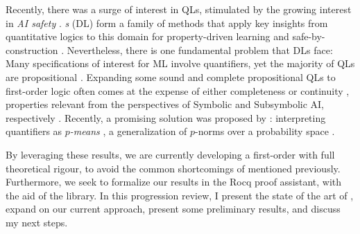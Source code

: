 Recently, there was a surge of interest in QLs, stimulated by the growing interest in \emph{AI safety} \mcita{}. \emph{\DL{}s} (DL) form a family of methods that apply key insights from quantitative logics to this domain for property-driven learning and safe-by-construction \InAI{} \mcita{}. Nevertheless, there is one fundamental problem that DLs face: Many specifications of interest for ML involve quantifiers, yet the majority of QLs are propositional \mcita{}.  Expanding some sound and complete propositional QLs to first-order logic often comes at the expense of either completeness or continuity \mcita{}, properties relevant from the perspectives of Symbolic and Subsymbolic AI, respectively \mcita{}.  Recently, a promising solution was proposed by \mcita{}: interpreting quantifiers as \textit{$p$-means} \mcita{}, a generalization of $p$-norms over a probability space \mcita{}.  

By leveraging these results, we are currently developing a first-order \DL{} with full theoretical rigour, to avoid the common shortcomings  of \InAI{} mentioned previously. Furthermore, we seek to formalize our results in the Rocq proof assistant, with the aid of the \mathcomp{} library. In this progression review, I present the state of the art of \yada, expand on our current approach, present some preliminary results,  and discuss my next steps. 

